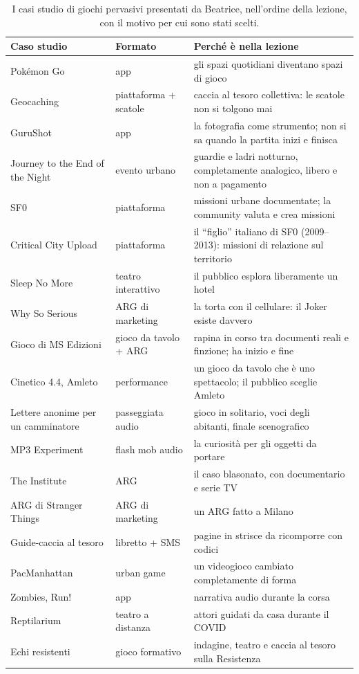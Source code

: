 \begin{table}[htbp]
\centering
\small
\begin{tabular}{@{}p{3.6cm}p{2.3cm}p{7.0cm}@{}}
\toprule
\textbf{Caso studio} & \textbf{Formato} & \textbf{Perché è nella lezione} \\
\midrule
Pokémon Go & app & gli spazi quotidiani diventano spazi di gioco \\
Geocaching & piattaforma + scatole & caccia al tesoro collettiva: le scatole
non si tolgono mai \\
GuruShot & app & la fotografia come strumento; non si sa quando la partita
inizi e finisca \\
Journey to the End of the Night & evento urbano & guardie e ladri notturno,
completamente analogico, libero e non a pagamento \\
SF0 & piattaforma & missioni urbane documentate; la community valuta e crea
missioni \\
Critical City Upload & piattaforma & il ``figlio'' italiano di SF0
(2009--2013): missioni di relazione sul territorio \\
Sleep No More & teatro interattivo & il pubblico esplora liberamente un hotel
\\
Why So Serious & ARG di marketing & la torta con il cellulare: il Joker esiste
davvero \\
Gioco di MS Edizioni & gioco da tavolo + ARG & rapina in corso tra documenti
reali e finzione; ha inizio e fine \\
Cinetico 4.4, Amleto & performance & un gioco da tavolo che è uno spettacolo; il
pubblico sceglie Amleto \\
Lettere anonime per un camminatore & passeggiata audio & gioco in solitario,
voci degli abitanti, finale scenografico \\
MP3 Experiment & flash mob audio & la curiosità per gli oggetti da portare \\
The Institute & ARG & il caso blasonato, con documentario e serie TV \\
ARG di Stranger Things & ARG di marketing & un ARG fatto a Milano \\
Guide-caccia al tesoro & libretto + SMS & pagine in strisce da ricomporre con
codici \\
PacManhattan & urban game & un videogioco cambiato completamente di forma \\
Zombies, Run! & app & narrativa audio durante la corsa \\
Reptilarium & teatro a distanza & attori guidati da casa durante il COVID \\
Echi resistenti & gioco formativo & indagine, teatro e caccia al tesoro sulla
Resistenza \\
\bottomrule
\end{tabular}
\caption{I casi studio di giochi pervasivi presentati da Beatrice, nell'ordine
della lezione, con il motivo per cui sono stati scelti.}
\label{a2:tab:pervasivi}
\end{table}

